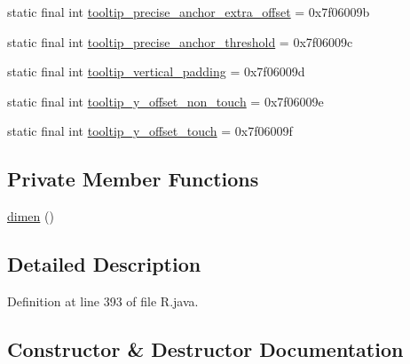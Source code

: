 \begin{DoxyCompactItemize}
\item 
static final int \mbox{\hyperlink{classandroid_1_1support_1_1v7_1_1appcompat_1_1_r_1_1dimen_a28345e187cf8fe67adb09f7f64199c68}{tooltip\+\_\+precise\+\_\+anchor\+\_\+extra\+\_\+offset}} = 0x7f06009b
\item 
static final int \mbox{\hyperlink{classandroid_1_1support_1_1v7_1_1appcompat_1_1_r_1_1dimen_a03fad3fc06deb25764c72b3113d4eb61}{tooltip\+\_\+precise\+\_\+anchor\+\_\+threshold}} = 0x7f06009c
\item 
static final int \mbox{\hyperlink{classandroid_1_1support_1_1v7_1_1appcompat_1_1_r_1_1dimen_a8484329c8d123e0cb60f46ae2a81f546}{tooltip\+\_\+vertical\+\_\+padding}} = 0x7f06009d
\item 
static final int \mbox{\hyperlink{classandroid_1_1support_1_1v7_1_1appcompat_1_1_r_1_1dimen_ac3ddf695b8b86c3ab7c1605b1f1e727c}{tooltip\+\_\+y\+\_\+offset\+\_\+non\+\_\+touch}} = 0x7f06009e
\item 
static final int \mbox{\hyperlink{classandroid_1_1support_1_1v7_1_1appcompat_1_1_r_1_1dimen_af398f083a7bf2c5553c7f9f8e66f2cdc}{tooltip\+\_\+y\+\_\+offset\+\_\+touch}} = 0x7f06009f
\end{DoxyCompactItemize}
\subsection*{Private Member Functions}
\begin{DoxyCompactItemize}
\item 
\mbox{\hyperlink{classandroid_1_1support_1_1v7_1_1appcompat_1_1_r_1_1dimen_ab664153a0dcbd269a33392f70946f104}{dimen}} ()
\end{DoxyCompactItemize}


\subsection{Detailed Description}


Definition at line 393 of file R.\+java.



\subsection{Constructor \& Destructor Documentation}
\mbox{\label{classandroid_1_1support_1_1v7_1_1appcompat_1_1_r_1_1dimen_ab664153a0dcbd269a33392f70946f104}} 
